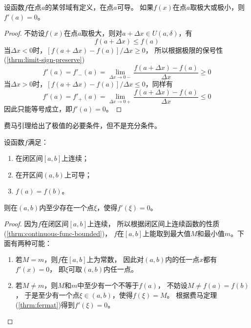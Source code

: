 \begin{lemma}[费马(Fermat)定理] \label{thrm:fermat}
  设函数$f$在点$a$的某邻域有定义，在点$a$可导。
  如果$f(x)$在点$a$取极大或极小，则$f'(a)=0$。
\end{lemma}
\begin{proof}
  不妨设$f(x)$在点$a$取极大，则对$a+\Delta x\in U(a,\delta)$，有
  \begin{displaymath}
    f(a+\Delta x) \le f(a)
  \end{displaymath}
  当$\Delta x < 0$时，$[f(a+\Delta x) - f(a)]/\Delta x \ge 0$，
  所以根据极限的保号性(\ref{thrm:limit-sign-preserve})
  \begin{displaymath}
    f'(a) = f'_{-}(a) =\lim_{\Delta x\to 0-}
      \frac{f(a+\Delta x) - f(a)}{\Delta x} \ge 0
  \end{displaymath}
  当$\Delta x > 0$时，$[f(a+\Delta x) - f(a)]/\Delta x \le 0$，同样有
  \begin{displaymath}
  f'(a) = f'_{+}(a) =\lim_{\Delta x\to 0+}
  \frac{f(a+\Delta x) - f(a)}{\Delta x} \le 0
  \end{displaymath}
  因此只能等号成立，即$f'(a)=0$。
\end{proof}
\begin{remark}
  费马引理给出了极值的必要条件，但不是充分条件。
\end{remark}

\begin{lemma}[罗尔(Rolle)定理] \label{thrm:rolle}
  设函数$f$满足：
  \begin{enumerate}
    \item
    在闭区间$[a,b]$上连续；
    \item
    在开区间$(a,b)$上可导；
    \item
    $f(a)=f(b)$。
  \end{enumerate}
  则在$(a,b)$内至少存在一个点$\xi$，使得$f'(\xi)=0$。
\end{lemma}
\begin{proof}
  因为$f$在闭区间$[a,b]$上连续，
  所以根据闭区间上连续函数的性质(\ref{thrm:continuous-func-bounded})，
  $f$在$[a,b]$上能取到最大值$M$和最小值$m$。下面有两种可能：
  \begin{enumerate}
    \item
    若$M = m$，则$f$在$[a,b]$上为常数，
    因此对$(a,b)$内的任一点$x$都有$f'(x)=0$，
    即$\xi$可取$(a,b)$内任一点。
    \item
    若$M\neq m$，则$M$和$m$中至少有一个不等于$f(a)$，
    不妨设$M\neq f(a)=f(b)$，
    于是至少有一个点$\xi\in(a,b)$，使得$f(\xi)=M$。
    根据费马定理(\ref{thrm:fermat})得到$f'(\xi)=0$。
  \end{enumerate}
\end{proof}

